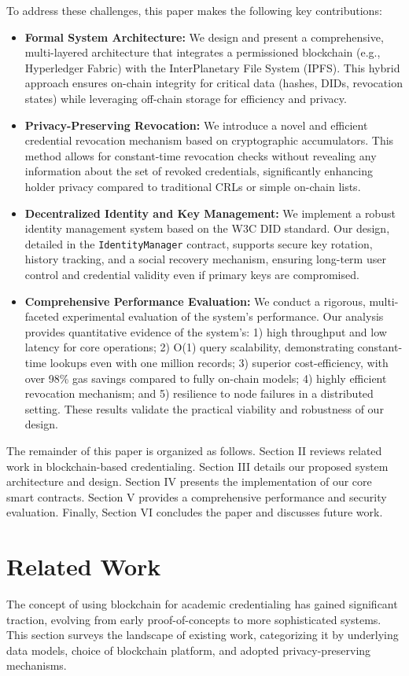 \documentclass[lettersize,journal]{IEEEtran}
\begin{document}
To address these challenges, this paper makes the following key contributions:
\begin{itemize}
    \item \textbf{Formal System Architecture:} We design and present a comprehensive, multi-layered architecture that integrates a permissioned blockchain (e.g., Hyperledger Fabric) with the InterPlanetary File System (IPFS). This hybrid approach ensures on-chain integrity for critical data (hashes, DIDs, revocation states) while leveraging off-chain storage for efficiency and privacy.
    \item \textbf{Privacy-Preserving Revocation:} We introduce a novel and efficient credential revocation mechanism based on cryptographic accumulators. This method allows for constant-time revocation checks without revealing any information about the set of revoked credentials, significantly enhancing holder privacy compared to traditional CRLs or simple on-chain lists.
    \item \textbf{Decentralized Identity and Key Management:} We implement a robust identity management system based on the W3C DID standard. Our design, detailed in the \texttt{IdentityManager} contract, supports secure key rotation, history tracking, and a social recovery mechanism, ensuring long-term user control and credential validity even if primary keys are compromised.
    \item \textbf{Comprehensive Performance Evaluation:} We conduct a rigorous, multi-faceted experimental evaluation of the system's performance. Our analysis provides quantitative evidence of the system's: 1) high throughput and low latency for core operations; 2) O(1) query scalability, demonstrating constant-time lookups even with one million records; 3) superior cost-efficiency, with over 98\% gas savings compared to fully on-chain models; 4) highly efficient revocation mechanism; and 5) resilience to node failures in a distributed setting. These results validate the practical viability and robustness of our design.
\end{itemize}

The remainder of this paper is organized as follows. Section II reviews related work in blockchain-based credentialing. Section III details our proposed system architecture and design. Section IV presents the implementation of our core smart contracts. Section V provides a comprehensive performance and security evaluation. Finally, Section VI concludes the paper and discusses future work.

\section{Related Work}
The concept of using blockchain for academic credentialing has gained significant traction, evolving from early proof-of-concepts to more sophisticated systems. This section surveys the landscape of existing work, categorizing it by underlying data models, choice of blockchain platform, and adopted privacy-preserving mechanisms.
\end{document}
